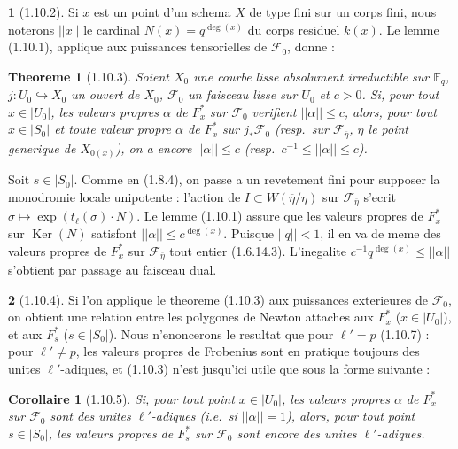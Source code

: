 \documentclass[12pt,a4paper]{article}
\theoremstyle{plain}
\newtheorem{corollaire}[theorem]{Corollaire}
\newtheorem{theoreme}{Theoreme}[section]
\theoremstyle{definition}
\theoremstyle{definition}
\newtheorem{para}{}[section]
\theoremstyle{remark}
\DeclareMathOperator{\Ker}{Ker}
\begin{document}
\begin{para}[1.10.2]
Si $x$ est un point d'un schema $X$ de type fini sur un corps fini, nous noterons $||x||$ le cardinal $N(x) = q^{\deg(x)}$ du corps residuel $k(x)$. Le lemme (1.10.1), applique aux puissances tensorielles de $\mathscr{F}_0$, donne :
\end{para}

\begin{theoreme}[1.10.3]
Soient $X_0$ une courbe lisse absolument irreductible sur $\mathbb{F}_q$, $j: U_0 \hookrightarrow X_0$ un ouvert de $X_0$, $\mathscr{F}_0$ un faisceau lisse sur $U_0$ et $c > 0$. Si, pour tout $x \in |U_0|$, les valeurs propres $\alpha$ de $F_x^*$ sur $\mathscr{F}_0$ verifient $||\alpha|| \leq c$, alors, pour tout $x \in |S_0|$ et toute valeur propre $\alpha$ de $F_x^*$ sur $j_* \mathscr{F}_0$ (resp.~sur $\mathscr{F}_{\overline{\eta}}$, $\eta$ le point generique de $X_{0(x)}$), on a encore $||\alpha|| \leq c$ (resp.~$c^{-1} \leq ||\alpha|| \leq c$).
\end{theoreme}

Soit $s \in |S_0|$. Comme en (1.8.4), on passe a un revetement fini pour supposer la monodromie locale unipotente : l'action de $I \subset W(\overline{\eta}/\eta)$ sur $\mathscr{F}_{\overline{\eta}}$ s'ecrit $\sigma \mapsto \exp(t_\ell(\sigma) \cdot N)$. Le lemme (1.10.1) assure que les valeurs propres de $F_x^*$ sur $\Ker(N)$ satisfont $||\alpha|| \leq c^{\deg(x)}$. Puisque $||q|| < 1$, il en va de meme des valeurs propres de $F_x^*$ sur $\mathscr{F}_{\overline{\eta}}$ tout entier (1.6.14.3). L'inegalite $c^{-1} q^{\deg(x)} \leq ||\alpha||$ s'obtient par passage au faisceau dual.

\begin{para}[1.10.4]
Si l'on applique le theoreme (1.10.3) aux puissances exterieures de $\mathscr{F}_0$, on obtient une relation entre les polygones de Newton attaches aux $F_x^*$ ($x \in |U_0|$), et aux $F_s^*$ ($s \in |S_0|$). Nous n'enoncerons le resultat que pour $\ell' = p$ (1.10.7) : pour $\ell' \neq p$, les valeurs propres de Frobenius sont en pratique toujours des unites $\ell'$-adiques, et (1.10.3) n'est jusqu'ici utile que sous la forme suivante :
\end{para}

\begin{corollaire}[1.10.5]
Si, pour tout point $x \in |U_0|$, les valeurs propres $\alpha$ de $F_x^*$ sur $\mathscr{F}_0$ sont des unites $\ell'$-adiques (i.e.~si $||\alpha|| = 1$), alors, pour tout point $s \in |S_0|$, les valeurs propres de $F_s^*$ sur $\mathscr{F}_0$ sont encore des unites $\ell'$-adiques.
\end{corollaire}
\end{document}

